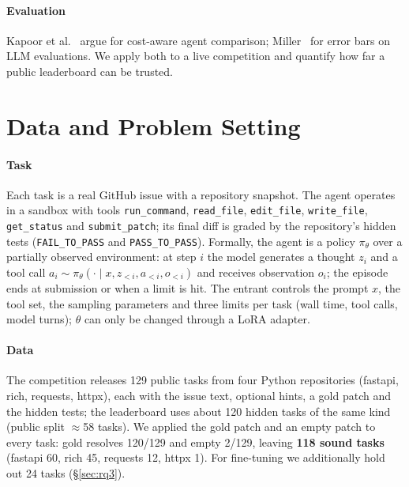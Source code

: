\documentclass[conference]{IEEEtran}
\begin{document}
\paragraph*{Evaluation} Kapoor et al.~\cite{kapoor2024agents} argue for cost-aware agent comparison; Miller~\cite{miller2024errorbars} for error bars on LLM evaluations. We apply both to a live competition and quantify how far a public leaderboard can be trusted.

\section{Data and Problem Setting}\label{sec:data}
\paragraph*{Task} Each task is a real GitHub issue with a repository snapshot. The agent operates in a sandbox with tools \texttt{run\_command}, \texttt{read\_file}, \texttt{edit\_file}, \texttt{write\_file}, \texttt{get\_status} and \texttt{submit\_patch}; its final diff is graded by the repository's hidden tests (\texttt{FAIL\_TO\_PASS} and \texttt{PASS\_TO\_PASS}). Formally, the agent is a policy $\pi_\theta$ over a partially observed environment: at step $i$ the model generates a thought $z_i$ and a tool call $a_i \sim \pi_\theta(\cdot \mid x, z_{<i}, a_{<i}, o_{<i})$ and receives observation $o_i$; the episode ends at submission or when a limit is hit. The entrant controls the prompt $x$, the tool set, the sampling parameters and three limits per task (wall time, tool calls, model turns); $\theta$ can only be changed through a LoRA adapter.

\paragraph*{Data} The competition releases 129 public tasks from four Python repositories (fastapi, rich, requests, httpx), each with the issue text, optional hints, a gold patch and the hidden tests; the leaderboard uses about 120 hidden tasks of the same kind (public split $\approx$58 tasks). We applied the gold patch and an empty patch to every task: gold resolves 120/129 and empty 2/129, leaving \textbf{118 sound tasks} (fastapi 60, rich 45, requests 12, httpx 1). For fine-tuning we additionally hold out 24 tasks (§\ref{sec:rq3}).
\end{document}
